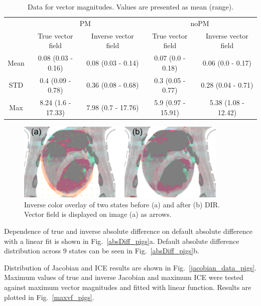 \documentclass[type=dr, dr=rernat, accentcolor=tud7b,colorbacktitle, bigchapter, openright, twoside, 12pt ]{tudthesis}
\begin{document}
\begin{table}[H]
  \centering
  \caption{Data for vector magnitudes. Values are presented as mean (range).}
  \begin{tabular}{c|c|c|c|c}
	    & \multicolumn{2}{|c|}{PM} & \multicolumn{2}{|c}{noPM} \\
  
            & True vector field   & Inverse vector field   & True vector field  & Inverse vector field \\
       \hline
	Mean & 0.08 (0.03 - 0.16) & 0.08 (0.03 - 0.14) & 0.07 (0.0 - 0.18)  & 0.06 (0.0 - 0.17) \\ 
	STD  & 0.4 (0.09 - 0.78)  & 0.36 (0.08 - 0.68) & 0.3 (0.05 - 0.77)  & 0.28 (0.04 - 0.71) \\ 
	Max  & 8.24 (1.6 - 17.33) & 7.98 (0.7 - 17.76) & 5.9 (0.97 - 15.91) & 5.38 (1.08 - 12.42) \\ 
    \hline\hline
  \end{tabular}
  \label{tab:vectordata_pig}
\end{table}

\begin{figure}[H]
	\begin{center}		
		\includegraphics[width=0.9\textwidth]{./Images/exampleReg_pigs.png}
		\caption{Inverse color overlay of two states before (a) and after (b) DIR. Vector field is displayed on image (a) as arrows.}
		\label{exampleReg_pigs}
	\end{center}
\end{figure}

Dependence of true and inverse absolute difference on default absolute difference with a linear fit is shown in Fig.~\ref{absDiff_pigs}a. 
Default absolute difference distribution across 9 states can be seen in Fig.~\ref{absDiff_pigs}b.

Distribution of Jacobian and ICE results are shown in Fig.~\ref{jacobian_data_pigs}. Maximum values of true and inverse Jacobian and maximum ICE were
tested against maximum vector magnitudes and fitted with linear function. Results are plotted in Fig.~\ref{maxvf_pigs}.
\end{document}
